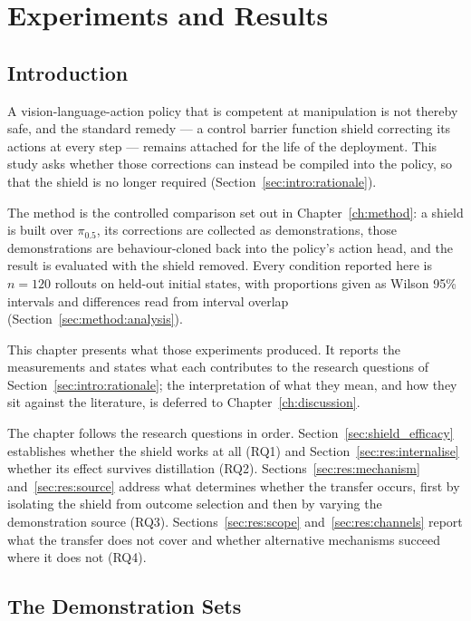 
\chapter{Experiments and Results}\label{ch:results}

\section{Introduction}\label{sec:res:intro}

A vision-language-action policy that is competent at manipulation is not thereby safe, and the
standard remedy --- a control barrier function shield correcting its actions at every step ---
remains attached for the life of the deployment. This study asks whether those corrections can
instead be compiled into the policy, so that the shield is no longer required
(Section~\ref{sec:intro:rationale}).

The method is the controlled comparison set out in Chapter~\ref{ch:method}: a shield is built over
$\pi_{0.5}$, its corrections are collected as demonstrations, those demonstrations are
behaviour-cloned back into the policy's action head, and the result is evaluated with the shield
removed. Every condition reported here is $n = 120$ rollouts on held-out initial states, with
proportions given as Wilson 95\% intervals and differences read from interval overlap
(Section~\ref{sec:method:analysis}).

This chapter presents what those experiments produced. It reports the measurements and states what
each contributes to the research questions of Section~\ref{sec:intro:rationale}; the interpretation
of what they mean, and how they sit against the literature, is deferred to
Chapter~\ref{ch:discussion}.

The chapter follows the research questions in order. Section~\ref{sec:shield_efficacy} establishes
whether the shield works at all (RQ1) and Section~\ref{sec:res:internalise} whether its effect
survives distillation (RQ2). Sections~\ref{sec:res:mechanism} and~\ref{sec:res:source} address what
determines whether the transfer occurs, first by isolating the shield from outcome selection and
then by varying the demonstration source (RQ3). Sections~\ref{sec:res:scope}
and~\ref{sec:res:channels} report what the transfer does not cover and whether alternative
mechanisms succeed where it does not (RQ4).

\section{The Demonstration Sets}\label{sec:res:demos}

